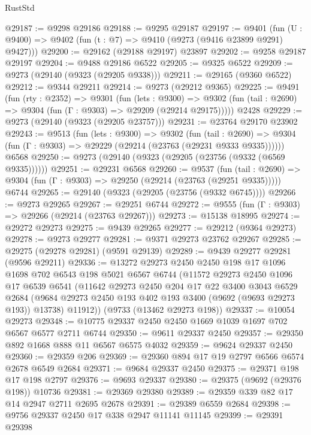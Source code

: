 \begin{lexlean}{RustStd}
\begin{coremodule}
@29187 := @9298 @29186
@29188 := @9295 @29187
@29197 := @9401
    (fun (U : @9400) => @9402 (fun (t : @7) => @9410 (@9273 (@9416 @23899 @9291) @9427)))
@29200 := @29162 (@29188 @29197) @23897
@29202 := @9258 @29187 @29197
@29204 := @9488 @29186 @6522
@29205 := @9325 @6522
@29209 := @9273 (@29140 (@9323 (@29205 @9338)))
@29211 := @29165 (@9360 @6522)
@29212 := @9344 @29211
@29214 := @9273 (@29212 @9365)
@29225 := @9491
    (fun (rty : @2352) =>
    @9301
      (fun (lets : @9300) =>
      @9302 (fun (tail : @2690) => @9304 (fun (Γ : @9303) => @29209 (@29214 @29175)))))
    @2428
@29229 := @9273 (@29140 (@9323 (@29205 @23757)))
@29231 := @23764 @29170 @23902
@29243 := @9513
    (fun (lets : @9300) =>
    @9302
      (fun (tail : @2690) =>
      @9304 (fun (Γ : @9303) => @29229 (@29214 (@23763 (@29231 @9333 @9335))))))
    @6568
@29250 := @9273 (@29140 (@9323 (@29205 (@23756 (@9332 (@6569 @9335))))))
@29251 := @29231 @6568
@29260 := @9537
    (fun (tail : @2690) => @9304 (fun (Γ : @9303) => @29250 (@29214 (@23763 (@29251 @9335)))))
    @6744
@29265 := @29140 (@9323 (@29205 (@23756 (@9332 @6745))))
@29266 := @9273 @29265
@29267 := @29251 @6744
@29272 := @9555 (fun (Γ : @9303) => @29266 (@29214 (@23763 @29267)))
@29273 := @15138 @18995
@29274 := @29272 @29273
@29275 := @9439 @29265
@29277 := @29212 (@9364 @29273)
@29278 := @9273 @29277
@29281 := @9371 @29273 @23762 @29267
@29285 := @29275 (@29278 @29281) (@9591 @29139)
@29289 := @9439 @29277 @29281 (@9596 @29211)
@29336 := @13272
    @29273
    @2450
    @2450
    @198
    @17
    @1096
    @1698
    @702
    @6543
    @198
    @5021
    @6567
    @6744
    (@11572
      @29273
      @2450
      @1096
      @17
      @6539
      @6541
      (@11642
        @29273
        @2450
        @204
        @17
        @22
        @3400
        @3043
        @6529
        @2684
        (@9684 @29273 @2450 @193 @402 @193 @3400 (@9692 (@9693 @29273 @193)) @13738)
        @11912))
    (@9733 (@13462 @29273 @198))
@29337 := @10054 @29273
@29348 := @10775 @29337 @2450 @2450 @1669 @1039 @1697 @702 @6567 @6577 @2711 @6744
@29350 := @9611 @29337 @2450
@29357 := @29350 @892 @1668 @888 @11 @6567 @6575 @4032
@29359 := @9624 @29337 @2450
@29360 := @29359 @206
@29369 := @29360 @894 @17 @19 @2797 @6566 @6574 @2678 @6549 @2684
@29371 := @9684 @29337 @2450
@29375 := @29371 @198 @17 @198 @2797
@29376 := @9693 @29337
@29380 := @29375 (@9692 (@29376 @198)) @10736
@29381 := @29369 @29380
@29389 := @29359 @339 @82 @17 @14 @2947 @2711 @2695 @2678
@29391 := @29389 @6559 @2684
@29398 := @9756 @29337 @2450 @17 @338 @2947 @11141 @11145
@29399 := @29391 @29398

\end{coremodule}
\end{lexlean}

